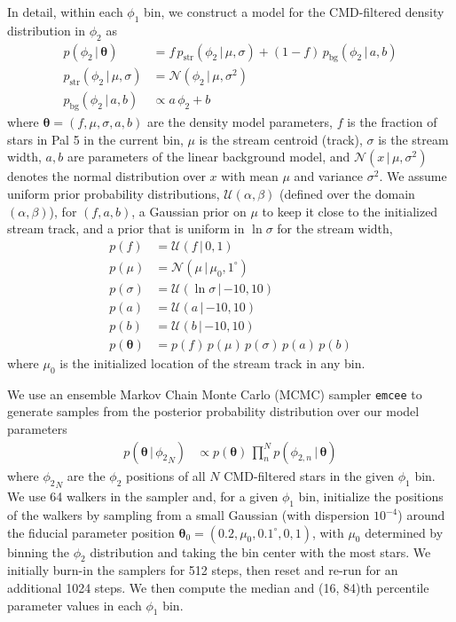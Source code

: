 \documentclass[twocolumn]{aastex62}
\newcommand{\bs}[1]{\boldsymbol{#1}}
\newcommand{\given}{\,|\,}
\newcommand{\sa}[1]{{\color{magenta} SP: #1}}
\begin{document}
In detail, within each $\phi_1$ bin, we construct a model for the CMD-filtered density distribution in $\phi_2$ as
\begin{align}
    p(\phi_2 \given \bs{\theta}) &=
        f \, p_{\textrm{str}}(\phi_2 \given \mu, \sigma) +
        (1-f) \, p_{\textrm{bg}}(\phi_2 \given a, b) \\
    p_{\textrm{str}}(\phi_2 \given \mu, \sigma) &=
        \mathcal{N}(\phi_2 \given \mu, \sigma^2)\\
    p_{\textrm{bg}}(\phi_2 \given a, b) &\propto
        a \, \phi_2 + b
\end{align}
where $\bs{\theta} = (f, \mu, \sigma, a, b)$ are the density model parameters, $f$ is the fraction of stars in Pal 5 in the current bin, $\mu$ is the stream centroid (track), $\sigma$ is the stream width, $a, b$ are parameters of the linear background model, and $\mathcal{N}(x \given \mu, \sigma^2)$ denotes the normal distribution over $x$ with mean $\mu$ and variance $\sigma^2$.
We assume uniform prior probability distributions, $\mathcal{U}(\alpha, \beta)$ (defined over the domain $(\alpha, \beta)$), for $(f, a, b)$, a Gaussian prior on $\mu$ to keep it close to the initialized stream track, and a prior that is uniform in $\ln \sigma$ for the stream width,
\begin{align}
    p(f) &= \mathcal{U}(f \given 0, 1)\\
    p(\mu) &= \mathcal{N}(\mu \given \mu_0, 1^\circ)\\
    p(\sigma) &= \mathcal{U}(\ln\sigma \given {-10}, 10)\\
    p(a) &= \mathcal{U}(a \given {-10}, 10)\\
    p(b) &= \mathcal{U}(b \given {-10}, 10)\\
    p(\bs{\theta}) &= p(f) \, p(\mu) \, p(\sigma) \, p(a) \, p(b)
\end{align}
where $\mu_0$ is the initialized location of the stream track in any bin.

We use an ensemble Markov Chain Monte Carlo (MCMC) sampler \texttt{emcee} \citep{Foreman-Mackey:2013} to generate samples from the posterior probability distribution over our model parameters
\begin{align}
    p(\bs{\theta} \given {\phi_2}_N) &\propto
        p(\bs{\theta}) \, \prod_n^N p(\phi_{2, n} \given \bs{\theta})
\end{align}
where ${\phi_2}_N$ are the $\phi_2$ positions of all $N$ CMD-filtered stars in the given $\phi_1$ bin.
We use 64 walkers in the sampler and, for a given $\phi_1$ bin, initialize the positions of the walkers by sampling from a small Gaussian (with dispersion $10^{-4}$) around the fiducial parameter position $\bs{\theta}_0 = (0.2, \mu_0, 0.1^\circ, 0, 1)$, with $\mu_0$ determined by binning the $\phi_2$ distribution and taking the bin center with the most stars.
We initially burn-in the samplers for 512 steps, then reset and re-run for an additional 1024 steps.
We then compute the median and (16, 84)th percentile parameter values in each $\phi_1$ bin.
\end{document}
